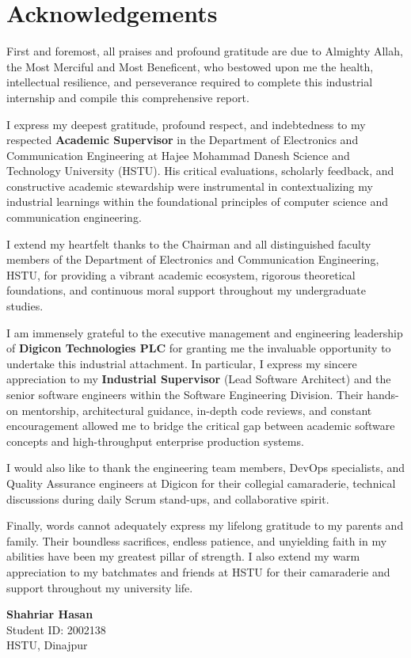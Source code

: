\chapter*{Acknowledgements}

\vspace{0.4cm}
First and foremost, all praises and profound gratitude are due to Almighty Allah, the Most Merciful and Most Beneficent, who bestowed upon me the health, intellectual resilience, and perseverance required to complete this industrial internship and compile this comprehensive report.

I express my deepest gratitude, profound respect, and indebtedness to my respected \textbf{Academic Supervisor} in the Department of Electronics and Communication Engineering at Hajee Mohammad Danesh Science and Technology University (HSTU). His critical evaluations, scholarly feedback, and constructive academic stewardship were instrumental in contextualizing my industrial learnings within the foundational principles of computer science and communication engineering.

I extend my heartfelt thanks to the Chairman and all distinguished faculty members of the Department of Electronics and Communication Engineering, HSTU, for providing a vibrant academic ecosystem, rigorous theoretical foundations, and continuous moral support throughout my undergraduate studies.

I am immensely grateful to the executive management and engineering leadership of \textbf{Digicon Technologies PLC} for granting me the invaluable opportunity to undertake this industrial attachment. In particular, I express my sincere appreciation to my \textbf{Industrial Supervisor} (Lead Software Architect) and the senior software engineers within the Software Engineering Division. Their hands-on mentorship, architectural guidance, in-depth code reviews, and constant encouragement allowed me to bridge the critical gap between academic software concepts and high-throughput enterprise production systems.

I would also like to thank the engineering team members, DevOps specialists, and Quality Assurance engineers at Digicon for their collegial camaraderie, technical discussions during daily Scrum stand-ups, and collaborative spirit.

Finally, words cannot adequately express my lifelong gratitude to my parents and family. Their boundless sacrifices, endless patience, and unyielding faith in my abilities have been my greatest pillar of strength. I also extend my warm appreciation to my batchmates and friends at HSTU for their camaraderie and support throughout my university life.

\vspace{1.5cm}
\begin{flushright}
    \textbf{Shahriar Hasan} \\
    Student ID: 2002138 \\
    HSTU, Dinajpur
\end{flushright}
